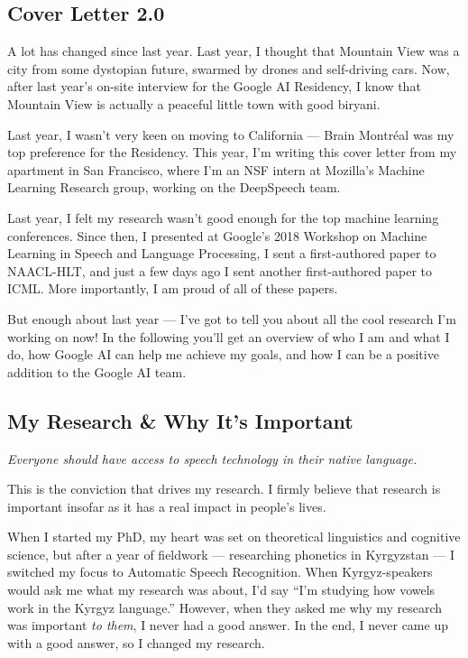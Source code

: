 \documentclass[12pt,a4paper]{article}
\begin{document}
\subsection*{Cover Letter 2.0}


A lot has changed since last year. Last year, I thought that Mountain View was a city from some dystopian future, swarmed by drones and self-driving cars. Now, after last year's on-site interview for the Google AI Residency, I know that Mountain View is actually a peaceful little town with good biryani.

Last year, I wasn't very keen on moving to California --- Brain Montr\'eal was my top preference for the Residency. This year, I'm writing this cover letter from my apartment in San Francisco, where I'm an NSF intern at Mozilla's Machine Learning Research group, working on the DeepSpeech team.

Last year, I felt my research wasn't good enough for the top machine learning conferences. Since then, I presented at Google's 2018 Workshop on Machine Learning in Speech and Language Processing, I sent a first-authored paper to NAACL-HLT, and just a few days ago I sent another first-authored paper to ICML. More importantly, I am proud of all of these papers.

But enough about last year --- I've got to tell you about all the cool research I'm working on now! In the following you'll get an overview of who I am and what I do, how Google AI can help me achieve my goals, and how I can be a positive addition to the Google AI team.




\subsection*{My Research \& Why It's Important}

\begin{center}
\textit{Everyone should have access to speech technology in their native language.}
\end{center}

This is the conviction that drives my research. I firmly believe that research is important insofar as it has a real impact in people's lives.

When I started my PhD, my heart was set on theoretical linguistics and cognitive science, but after a year of fieldwork --- researching phonetics in Kyrgyzstan --- I switched my focus to Automatic Speech Recognition. When Kyrgyz-speakers would ask me what my research was about, I'd say ``I'm studying how vowels work in the Kyrgyz language.'' However, when they asked me why my research was important \textit{to them}, I never had a good answer. In the end, I never came up with a good answer, so I changed my research.
\end{document}
